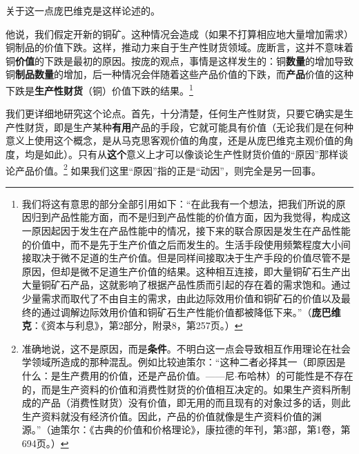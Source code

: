 \documentclass[fontset=fandol, a4paper, 12pt, openright]{ctexbook}
\begin{document}
关于这一点庞巴维克是这样论述的。

他说，我们假定开新的铜矿。这种情况会造成（如果不打算相应地大量增加需求）铜制品的价值下跌。这样，推动力来自于生产性财货领域。庞断言，这并不意味着铜\textbf{价值}的下跌是最初的原因。按庞的观点，事情是这样发生的：铜\textbf{数量}的增加导致铜\textbf{制品数量}的增加，后一种情况会伴随着这些产品价值的下跌，而\textbf{产品}价值的这种下跌是\textbf{生产性财货}（铜）价值下跌的结果。\footnote{我们将这有意思的部分全部引用如下：“在此我有一个想法，把我们所说的原因归到产品性能方面，而不是归到产品性能的价值方面，因为我觉得，构成这一原因起因于发生在产品性能中的情况，接下来的联合原因是发生在产品性能的价值中，而不是先于生产价值之后而发生的。生活手段使用频繁程度大小间接取决于微不足道的生产价值。但是同样间接取决于生产手段的价值尽管不是原因，但却是微不足道生产价值的结果。这种相互连接，即大量铜矿石生产出大量铜矿石产品，这就影响了根据产品性质而引起的存在着的需求饱和。通过少量需求而取代了不由自主的需求，由此边际效用价值和铜矿石的价值以及最终的通过调解边际效用价值和铜矿石生产性能价值都被降低下来。”（\textbf{庞巴维克}：《资本与利息》，第2部分，附录8，第257页。）}

我们更详细地研究这个论点。首先，十分清楚，任何生产性财货，只要它确实是生产性财货，即是生产某种\textbf{有用}产品的手段，它就可能具有价值（无论我们是在何种意义上使用这个概念，是从马克思客观价值的角度，还是从庞巴维克主观价值的角度，均是如此）。只有从\textbf{这个}意义上才可以像谈论生产性财货价值的“原因”那样谈论产品价值。\footnote{准确地说，这不是原因，而是\textbf{条件}。不明白这一点会导致相互作用理论在社会学领域所造成的那种混乱。例如比较迪策尔：“这种二者必择其一（即原因是什么：是生产费用的价值，还是产品价值。——尼$\cdot$布哈林）的可能性是不存在的，而是生产资料的价值和消费性财货的价值相互决定的。如果生产资料所制成的产品（消费性财货）没有价值，即无用的而且现有的对象过多的话，则此生产资料就没有经济价值。因此，产品的价值就像是生产资料价值的渊源。”（迪策尔：《古典的价值和价格理论》，康拉德的年刊，第3部，第1卷，第694页。）} 如果我们这里“原因”指的正是“动因”，则完全是另一回事。
\end{document}
